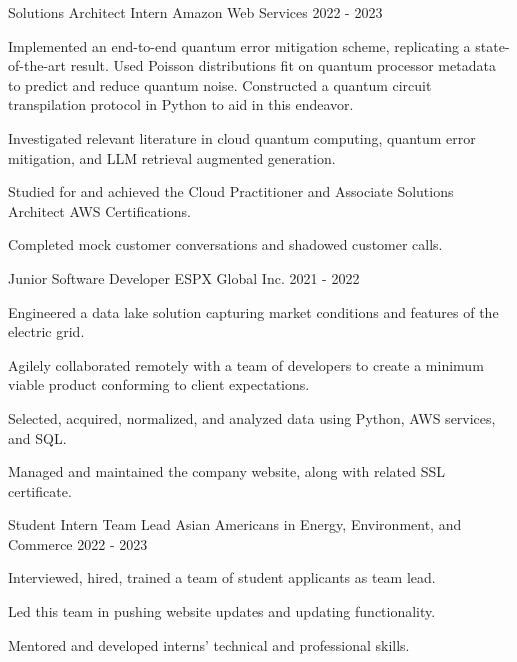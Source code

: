 
\begin{cventries}
\cventry
{Solutions Architect Intern}
{Amazon Web Services}
{2022 - 2023}
{}{{\begin{cvitems}
\item Implemented an end-to-end quantum error mitigation scheme, replicating a state-of-the-art result. Used Poisson distributions fit on quantum processor metadata to predict and reduce quantum noise. Constructed a quantum circuit transpilation protocol in Python to aid in this endeavor.
\item Investigated relevant literature in cloud quantum computing, quantum error mitigation, and LLM retrieval augmented generation.
\item Studied for and achieved the Cloud Practitioner and Associate Solutions Architect AWS Certifications.
\item Completed mock customer conversations and shadowed customer calls.
\end{cvitems}
}}

\cventry
{Junior Software Developer}
{ESPX Global Inc.}
{2021 - 2022}
{}{{\begin{cvitems}
\item Engineered a data lake solution capturing market conditions and features of the electric grid.
\item Agilely collaborated remotely with a team of developers to create a minimum viable product conforming to client expectations.
\item Selected, acquired, normalized, and analyzed data using Python, AWS services, and SQL.
\item Managed and maintained the company website, along with related SSL certificate.
\end{cvitems}
}}

\cventry
{Student Intern Team Lead}
{Asian Americans in Energy, Environment, and Commerce}
{2022 - 2023}
{}{{\begin{cvitems}
\item Interviewed, hired, trained a team of student applicants as team lead.
\item Led this team in pushing website updates and updating functionality.
\item Mentored and developed interns' technical and professional skills.
\end{cvitems}
}}


\end{cventries}
